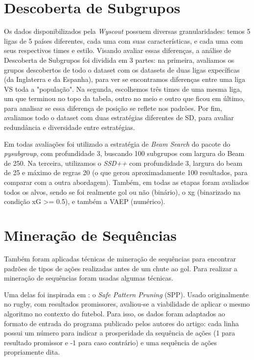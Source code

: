 \documentclass{article}
\begin{document}
\section{Descoberta de Subgrupos}

Os dados disponibilizados pela \textit{Wyscout} possuem diversas granularidades: 
temos 5 ligas de 5 países diferentes, cada uma com suas características, e cada 
uma com seus respectivos times e estilo. Visando avaliar essas diferenças, a 
análise de Descoberta de Subgrupos foi dividida em 3 partes: na primeira, 
avaliamos os grupos descobertos de todo o dataset com os datasets de duas ligas 
expecíficas (da Inglaterra e da Espanha), para ver se encontramos diferenças 
entre uma liga VS toda a "população". Na segunda, escolhemos três times de uma 
mesma liga, um que terminou no topo da tabela, outro no meio e outro que ficou 
em último, para analisar se essa diferença de posição se reflete nos padrões. Por 
fim, avaliamos todo o dataset com duas estratégias diferentes de SD, para avaliar 
redundância e diversidade entre estratégias.

Em todas avaliações foi utilizado a estratégia de \textit{Beam Search} 
do pacote do \textit{pysubgroup}, com profundidade 3, buscando 100 subgrupos com 
largura do Beam de 250. Na terceira, utilizamos o \textit{SSD++} com profundidade 
3, largura do beam de 25 e máximo de regras 20 (o que gerou aproximadamente 100 
resultados, para comparar com a outra abordagem). Também, em todas as etapas 
foram avaliados todos os alvos, sendo se foi realmente gol ou não (binário), o xg 
(binarizado na condição xG >= 0.5), e também a VAEP (numérico).


\section{Mineração de Sequências}

Também foram aplicadas técnicas de mineração de sequências para encontrar
padrões de tipos de ações realizadas antes de um chute ao gol. Para realizar a
mineração de sequências foram usadas algumas técnicas. 

Uma delas foi inspirada em \cite{bunker2021supervised}: o \textit{Safe Pattern
Pruning} (SPP). Usado originalmente no rugby, com resultados promissores,
avaliou-se a viabilidade de aplicar o mesmo algoritmo no contexto do futebol.
Para isso, os dados foram adaptados ao formato de entrada do programa publicado
pelos autores do artigo: cada linha possui um número para indicar a prosperidade
da sequência de ações (1 para resultado promissor e -1 para caso contrário) e
uma sequência de ações propriamente dita.
\end{document}
